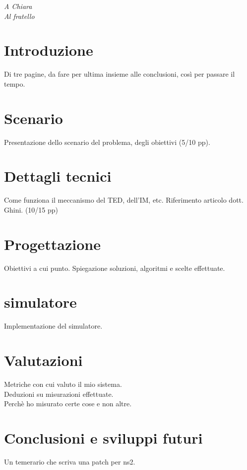 \documentclass[12pt,a4paper,openright,twoside]{book}
\begin{document}
%
%
\begin{titlepage}
	\thispagestyle{empty}
	\topmargin=6.5cm
	\raggedleft
	\large
	\em
	A Chiara\\
	Al fratello
\end{titlepage}


\chapter*{Introduzione}

	Di tre pagine, da fare per ultima insieme alle conclusioni, così per passare
	il tempo.

\tableofcontents

\chapter{Scenario}

	Presentazione dello scenario del problema, degli obiettivi (5/10 pp).

\chapter{Dettagli tecnici}

	Come funziona il meccanismo del TED, dell'IM, etc. Riferimento articolo
	dott. Ghini. (10/15 pp)

\chapter{Progettazione}

	Obiettivi a cui punto. Spiegazione soluzioni, algoritmi e scelte effettuate.

\chapter{simulatore}

	Implementazione del simulatore.

\chapter{Valutazioni}

	Metriche con cui valuto il mio sistema.\\
	Deduzioni su misurazioni effettuate.\\
	Perchè ho misurato certe cose e non altre.

\chapter{Conclusioni e sviluppi futuri}

	Un temerario che scriva una patch per ns2.
\end{document}
